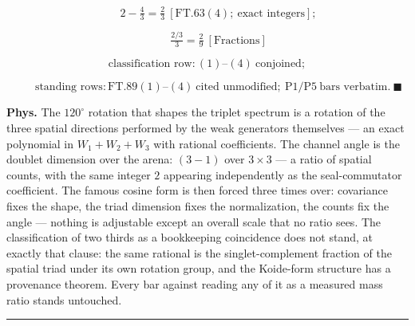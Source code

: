 \begin{theorem}
\[
\qquad 2-\tfrac43=\tfrac23\ [\mathrm{FT.63}(4);\ \text{exact integers}];
\]

\[
\qquad \tfrac{2/3}3=\tfrac29\ [\text{Fractions}]
\]

\[
\text{classification row}: (1)\text{–}(4)\ \text{conjoined};
\]

\[
\qquad \text{standing rows}: \mathrm{FT.89}(1)\text{–}(4)\ \text{cited unmodified};\ \mathrm{P1}/\mathrm{P5}\ \text{bars verbatim}.\ \blacksquare
\]

\textbf{Phys.} The $120^\circ$ rotation that shapes the triplet spectrum is a rotation of the three spatial directions performed by the weak generators themselves — an exact polynomial in $W_1+W_2+W_3$ with rational coefficients. The channel angle is the doublet dimension over the arena: $(3-1)$ over $3\times3$ — a ratio of spatial counts, with the same integer $2$ appearing independently as the seal-commutator coefficient. The famous cosine form is then forced three times over: covariance fixes the shape, the triad dimension fixes the normalization, the counts fix the angle — nothing is adjustable except an overall scale that no ratio sees. The classification of two thirds as a bookkeeping coincidence does not stand, at exactly that clause: the same rational is the singlet-complement fraction of the spatial triad under its own rotation group, and the Koide-form structure has a provenance theorem. Every bar against reading any of it as a measured mass ratio stands untouched.

\vspace{2pt}\noindent\rule{\textwidth}{0.4pt}\vspace{2pt}

\end{theorem}

